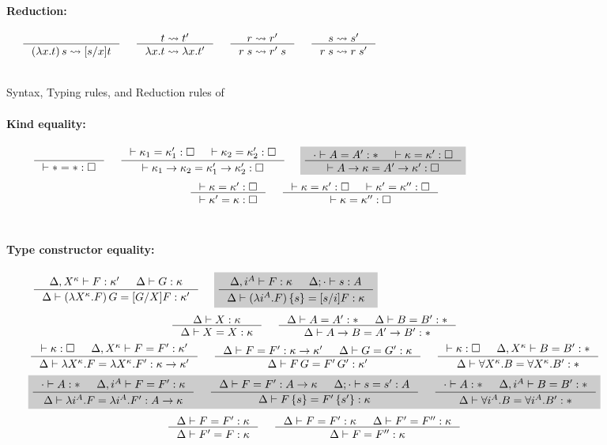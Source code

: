 \begin{figure*}
\paragraph{Reduction:} 
$ 
 ~~~~
   \inference{}{(\lambda x.t)\,s \rightsquigarrow [s/x]t}
 ~~~~
   \inference{t \rightsquigarrow t'}{\lambda x.t \rightsquigarrow \lambda x.t'}
 ~~~~
   \inference{r \rightsquigarrow r'}{r\;s \rightsquigarrow r'\;s}
 ~~~~
   \inference{s \rightsquigarrow s'}{r\;s \rightsquigarrow r\;s'}
$
~\\ ~\\
\caption{Syntax, Typing rules, and Reduction rules of \Fi}
\label{fig:Fi}
\end{figure*}

\begin{figure*}
\paragraph{Kind equality:} 
$ \quad
 ~~~~
   \inference{}{|- * = *:\square}
 ~~~~
   \inference{ |- \kappa_1 = \kappa_1' : \square
             & |- \kappa_2 = \kappa_2' : \square }
             {|- \kappa_1 -> \kappa_2 = \kappa_1' -> \kappa_2' : \square}
 ~~~~ \newFi{
   \inference{\cdot |- A=A':* & |- \kappa=\kappa':\square}
             {|- A -> \kappa = A' -> \kappa' : \square} }
$
\[ \inference{|- \kappa=\kappa':\square}
             {|- \kappa'=\kappa:\square}
 ~~~~
   \inference{ |- \kappa =\kappa' :\square
             & |- \kappa'=\kappa'':\square}
             {|- \kappa=\kappa'':\square}
\]
~\\
\paragraph{Type constructor equality:} 
$ \quad
 ~~~~
   \inference{\Delta,X^\kappa |- F:\kappa' & \Delta |- G:\kappa}
             {\Delta |- (\lambda X^\kappa.F)\,G = [G/X]F:\kappa'}
 ~~~~ \newFi{
   \inference{\Delta,i^A |- F:\kappa & \Delta;\cdot |- s:A}
             {\Delta |- (\lambda i^A.F)\,\{s\} = [s/i]F:\kappa} }
$
\[ \inference{\Delta |- X:\kappa }{\Delta |- X=X:\kappa}
 ~~~~
   \inference{\Delta |- A=A':* & \Delta |- B=B':*}{\Delta |- A-> B=A'-> B':*}
\]
\[ \inference{|- \kappa:\square & \Delta,X^\kappa |- F=F' : \kappa'}
             {\Delta |- \lambda X^\kappa.F=\lambda X^\kappa.F':\kappa-> \kappa'}
 ~~~~
   \inference{\Delta |- F=F':\kappa->\kappa' & \Delta |- G=G':\kappa}
             {\Delta |- F\,G = F'\,G' : \kappa'}
 ~~~~
   \inference{|- \kappa:\square & \Delta,X^\kappa |- B=B':*}
             {\Delta |- \forall X^\kappa.B=\forall X^\kappa.B':*}
\]
\[ \newFi{
   \inference{\cdot |- A:* & \Delta,i^A |- F=F' : \kappa}
             {\Delta |- \lambda i^A.F=\lambda i^A.F' : A -> \kappa}
 ~~~~
   \inference{\Delta |- F=F':A->\kappa & \Delta;\cdot |- s=s':A}
             {\Delta |- F\,\{s\} = F'\,\{s'\} : \kappa}
 ~~~~
   \inference{\cdot |- A:* & \Delta,i^A |- B=B':*}
             {\Delta |- \forall i^A.B=\forall i^A.B':*} }
\]
\[ \inference{\Delta |- F = F' : \kappa}{\Delta |- F' = F : \kappa}
 ~~~~
   \inference{\Delta |- F = F' : \kappa & \Delta |- F' = F'' : \kappa}
             {\Delta |- F = F'' : \kappa}
\]
~\\

\end{figure*}
